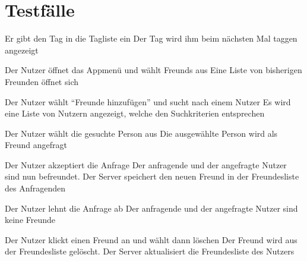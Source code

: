 \chapter{Testfälle}

{Er gibt den Tag in die Tagliste ein}
{Der Tag wird ihm beim nächsten Mal taggen angezeigt}




{Der Nutzer öffnet das Appmenü und wählt \glspl{Freund} aus}
{Eine Liste von bisherigen Freunden öffnet sich}

{Der Nutzer wählt "`Freunde hinzufügen"' und sucht nach einem Nutzer}
{Es wird eine Liste von Nutzern angezeigt, welche den Suchkriterien entsprechen}

{Der Nutzer wählt die gesuchte Person aus}
{Die ausgewählte Person wird als Freund angefragt}

{Der Nutzer akzeptiert die Anfrage}
{Der anfragende und der angefragte Nutzer sind nun befreundet. Der Server speichert den neuen Freund in der Freundesliste des Anfragenden}

{Der Nutzer lehnt die Anfrage ab}
{Der anfragende und der angefragte Nutzer sind keine Freunde}



{Der Nutzer klickt einen Freund an und wählt dann löschen}
{Der Freund wird aus der Freundesliste gelöscht. Der Server aktualisiert die Freundesliste des Nutzers}



